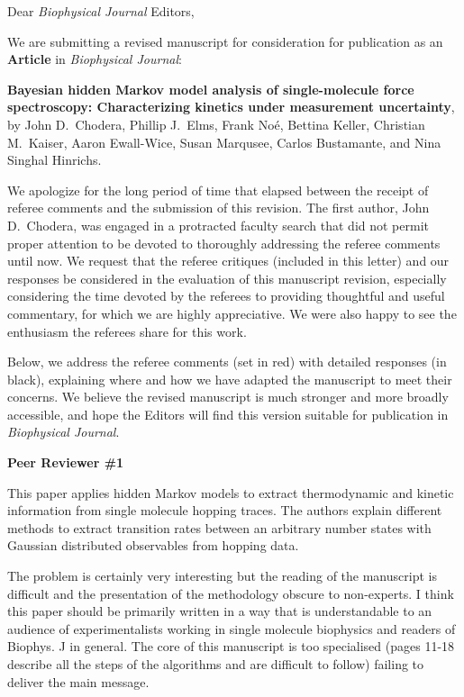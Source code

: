 \documentclass[ucb,qb3,10pt,fullfrom]{ucletter}
\date{\today}
\begin{document}
\begin{letter}{}
\opening{Dear \emph{Biophysical Journal} Editors,}

We are submitting a revised manuscript for consideration for publication as an {\bf Article} in \emph{Biophysical Journal}:

{\bf Bayesian hidden Markov model analysis of single-molecule force spectroscopy: Characterizing kinetics under measurement uncertainty}, by John D.~Chodera, Phillip J.~Elms, Frank No\'{e}, Bettina Keller, Christian M.~Kaiser, Aaron Ewall-Wice,  Susan Marqusee, Carlos Bustamante, and Nina Singhal Hinrichs.

We apologize for the long period of time that elapsed between the receipt of referee comments and the submission of this revision.
The first author, John D.~Chodera, was engaged in a protracted faculty search that did not permit proper attention to be devoted to thoroughly addressing the referee comments until now.
We request that the referee critiques (included in this letter) and our responses be considered in the evaluation of this manuscript revision, especially considering the time devoted by the referees to providing thoughtful and useful commentary, for which we are highly appreciative.
We were also happy to see the enthusiasm the referees share for this work.

Below, we address the referee comments (set in red) with detailed responses (in black), explaining where and how we have adapted the manuscript to meet their concerns.
We believe the revised manuscript is much stronger and more broadly accessible, and hope the Editors will find this version suitable for publication in \emph{Biophysical Journal}.

\color{red}
{\bf Peer Reviewer \#1}

This paper applies hidden Markov models to extract thermodynamic and kinetic information from single molecule hopping traces. The authors explain different methods to extract transition rates between an arbitrary number states with Gaussian distributed observables from hopping data.

The problem is certainly very interesting but the reading of the manuscript is difficult and the presentation of the methodology obscure to non-experts. I think this paper should be primarily written in a way that is understandable to an audience of experimentalists working in single molecule biophysics and readers of Biophys. J in general. The core of this manuscript is too specialised (pages 11-18 describe all the steps of the algorithms and are difficult to follow) failing to deliver the main message.
\color{black}


\end{letter}
\end{document}

